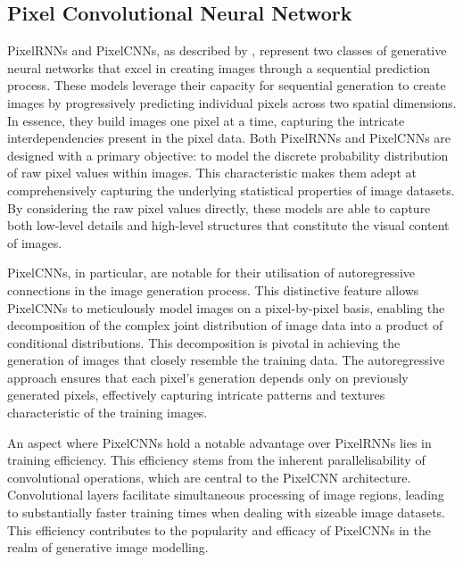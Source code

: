 \subsection{Pixel Convolutional Neural Network}
\label{subsec:pixelcnn}
PixelRNNs and PixelCNNs, as described by \cite{oord2016pixel}, represent two classes of generative neural networks that excel in creating images through a sequential prediction process. These models leverage their capacity for sequential generation to create images by progressively predicting individual pixels across two spatial dimensions. In essence, they build images one pixel at a time, capturing the intricate interdependencies present in the pixel data. Both PixelRNNs and PixelCNNs are designed with a primary objective: to model the discrete probability distribution of raw pixel values within images. This characteristic makes them adept at comprehensively capturing the underlying statistical properties of image datasets. By considering the raw pixel values directly, these models are able to capture both low-level details and high-level structures that constitute the visual content of images.

PixelCNNs, in particular, are notable for their utilisation of autoregressive connections in the image generation process. This distinctive feature allows PixelCNNs to meticulously model images on a pixel-by-pixel basis, enabling the decomposition of the complex joint distribution of image data into a product of conditional distributions. This decomposition is pivotal in achieving the generation of images that closely resemble the training data. The autoregressive approach ensures that each pixel's generation depends only on previously generated pixels, effectively capturing intricate patterns and textures characteristic of the training images.

An aspect where PixelCNNs hold a notable advantage over PixelRNNs lies in training efficiency. This efficiency stems from the inherent parallelisability of convolutional operations, which are central to the PixelCNN architecture. Convolutional layers facilitate simultaneous processing of image regions, leading to substantially faster training times when dealing with sizeable image datasets. This efficiency contributes to the popularity and efficacy of PixelCNNs in the realm of generative image modelling.


